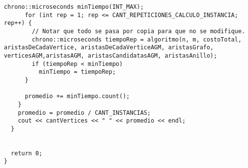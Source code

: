 \begin{lstlisting}[frame=single]
      chrono::microseconds minTiempo(INT_MAX);
      for (int rep = 1; rep <= CANT_REPETICIONES_CALCULO_INSTANCIA; rep++) {
        // Notar que todo se pasa por copia para que no se modifique.
        chrono::microseconds tiempoRep = algoritmo(n, m, costoTotal, aristasDeCadaVertice, aristasDeCadaVerticeAGM, aristasGrafo, verticesAGM,aristasAGM, aristasCandidatasAGM, aristasAnillo);
        if (tiempoRep < minTiempo)
          minTiempo = tiempoRep;
      }
      
      promedio += minTiempo.count();
    }
    promedio = promedio / CANT_INSTANCIAS;
    cout << cantVertices << " " << promedio << endl;
  }
  
  
  return 0;
}
\end{lstlisting}
